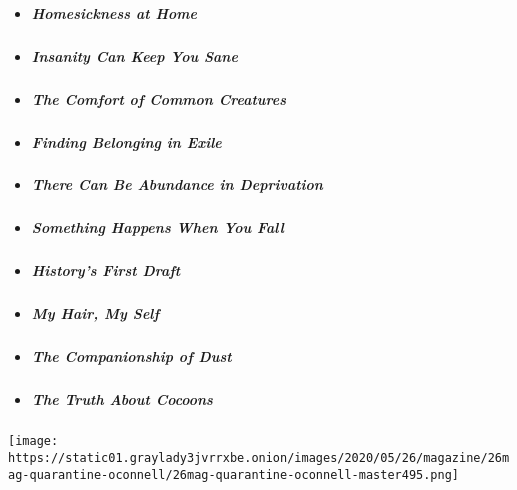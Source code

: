 \begin{itemize}
\item
  \protect\hyperlink{homesickness}{}

  \hypertarget{homesickness-at-home}{%
  \subparagraph{Homesickness at Home}\label{homesickness-at-home}}
\item
  \protect\hyperlink{insanity}{}

  \hypertarget{insanity-can-keep-you-sane}{%
  \subparagraph{Insanity Can Keep You
  Sane}\label{insanity-can-keep-you-sane}}
\item
  \protect\hyperlink{nature}{}

  \hypertarget{the-comfort-of-common-creatures}{%
  \subparagraph{The Comfort of Common
  Creatures}\label{the-comfort-of-common-creatures}}
\item
  \protect\hyperlink{paris}{}

  \hypertarget{finding-belonging-in-exile}{%
  \subparagraph{Finding Belonging in
  Exile}\label{finding-belonging-in-exile}}
\item
  \protect\hyperlink{recovery}{}

  \hypertarget{there-can-be-abundance-in-deprivation}{%
  \subparagraph{There Can Be Abundance in
  Deprivation}\label{there-can-be-abundance-in-deprivation}}
\item
  \protect\hyperlink{willi-ruge-photographs}{}

  \hypertarget{something-happens-when-you-fall}{%
  \subparagraph{Something Happens When You
  Fall}\label{something-happens-when-you-fall}}
\item
  \protect\hyperlink{diary}{}

  \hypertarget{historys-first-draft}{%
  \subparagraph{History's First Draft}\label{historys-first-draft}}
\item
  \protect\hyperlink{hair}{}

  \hypertarget{my-hair-my-self}{%
  \subparagraph{My Hair, My Self}\label{my-hair-my-self}}
\item
  \protect\hyperlink{dusting}{}

  \hypertarget{the-companionship-of-dust}{%
  \subparagraph{The Companionship of
  Dust}\label{the-companionship-of-dust}}
\item
  \protect\hyperlink{cocoons}{}

  \hypertarget{the-truth-about-cocoons}{%
  \subparagraph{The Truth About Cocoons}\label{the-truth-about-cocoons}}
\end{itemize}

\texttt{[image: https://static01.graylady3jvrrxbe.onion/images/2020/05/26/magazine/26mag-quarantine-oconnell/26mag-quarantine-oconnell-master495.png]}

